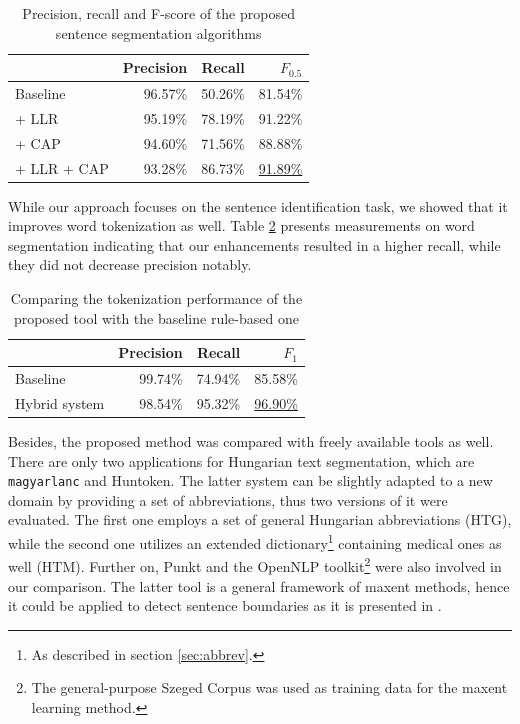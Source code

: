 \begin{table}[H]
\centering
\caption{Precision, recall and F-score of the proposed sentence segmentation algorithms}
\label{tab:prec_rec}
\begin{tabular}{ l r r  r  } 
\hline
& Precision & Recall & $F_{0.5}$ \\
\hline
Baseline & 96.57\% & 50.26\% & 81.54\%  \\
+ LLR & 95.19\% & 78.19\% & 91.22\% \\
+ CAP & 94.60\% & 71.56\% & 88.88\% \\
+ LLR + CAP & 93.28\% & 86.73\% & \underline{91.89\%} \\
\hline
\end{tabular}
\end{table}


While our approach focuses on the sentence identification task, we showed that it improves word tokenization as well. 
Table \ref{tab:tok_eval} presents measurements on word segmentation indicating that our enhancements resulted in a higher recall, while they did not decrease precision notably. \label{sec:eval}


\begin{table}[H]
\centering
\caption{Comparing the tokenization performance of the proposed tool with the baseline rule-based one}
\label{tab:tok_eval}
\begin{tabular}{ l r r r} 
\hline
& Precision & Recall & $F_{1}$ \\
\hline
Baseline & 99.74\% & 74.94\% & 85.58\%  \\
Hybrid system & 98.54\% & 95.32\% & \underline{96.90\%} \\
\hline
\end{tabular}
\end{table}

Besides, the proposed method was compared with freely available tools as well.
There are only two applications for Hungarian text segmentation, which are \texttt{magyarlanc} and Huntoken.
The latter system can be slightly adapted to a new domain by providing a set of abbreviations, thus two versions of it were evaluated. 
The first one employs a set of general Hungarian abbreviations (HTG), while the second one utilizes an extended dictionary\footnote{As described in section \ref{sec:abbrev}.} containing medical ones as well (HTM). 
Further on, Punkt \cite{kiss2006unsupervised} and the OpenNLP \cite{Baldridge2002} toolkit\footnote{The general-purpose Szeged Corpus was used as training data for the \acrlong{maxent} learning method.} were also involved in our comparison. 
The latter tool is a general framework of \acrlong{maxent} methods, hence it could be applied to detect sentence boundaries as it is presented in \cite{reynar1997maximum}.


